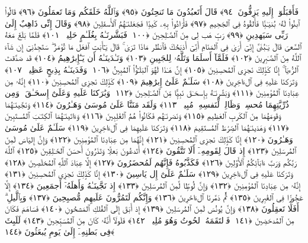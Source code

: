  فَأَقبَلُوٓا۟ إِلَيهِ يَزِفُّونَ ﴿٩٤﴾
 قَالَ أَتَعبُدُونَ مَا تَنحِتُونَ ﴿٩٥﴾
 وَٱللَّهُ خَلَقَكُم وَمَا تَعمَلُونَ ﴿٩٦﴾
 قَالُوا۟ ٱبنُوا۟ لَهُۥ بُنيَـٰنًۭا فَأَلقُوهُ فِى ٱلجَحِيمِ ﴿٩٧﴾
 فَأَرَادُوا۟ بِهِۦ كَيدًۭا فَجَعَلنَـٰهُمُ ٱلأَسفَلِينَ ﴿٩٨﴾
 وَقَالَ إِنِّى ذَاهِبٌ إِلَىٰ رَبِّى سَيَهدِينِ ﴿٩٩﴾
 رَبِّ هَب لِى مِنَ ٱلصَّـٰلِحِينَ ﴿١٠٠﴾
 فَبَشَّرنَـٰهُ بِغُلَـٰمٍ حَلِيمٍۢ ﴿١٠١﴾
 فَلَمَّا بَلَغَ مَعَهُ ٱلسَّعىَ قَالَ يَـٰبُنَىَّ إِنِّىٓ أَرَىٰ فِى ٱلمَنَامِ أَنِّىٓ أَذبَحُكَ فَٱنظُر مَاذَا تَرَىٰ ۚ قَالَ يَـٰٓأَبَتِ ٱفعَل مَا تُؤمَرُ ۖ سَتَجِدُنِىٓ إِن شَآءَ ٱللَّهُ مِنَ ٱلصَّـٰبِرِينَ ﴿١٠٢﴾
 فَلَمَّآ أَسلَمَا وَتَلَّهُۥ لِلجَبِينِ ﴿١٠٣﴾
 وَنَـٰدَينَـٰهُ أَن يَـٰٓإِبرَٰهِيمُ ﴿١٠٤﴾
 قَد صَدَّقتَ ٱلرُّءيَآ ۚ إِنَّا كَذَٟلِكَ نَجزِى ٱلمُحسِنِينَ ﴿١٠٥﴾
 إِنَّ هَـٰذَا لَهُوَ ٱلبَلَـٰٓؤُا۟ ٱلمُبِينُ ﴿١٠٦﴾
 وَفَدَينَـٰهُ بِذِبحٍ عَظِيمٍۢ ﴿١٠٧﴾
 وَتَرَكنَا عَلَيهِ فِى ٱلءَاخِرِينَ ﴿١٠٨﴾
 سَلَـٰمٌ عَلَىٰٓ إِبرَٰهِيمَ ﴿١٠٩﴾
 كَذَٟلِكَ نَجزِى ٱلمُحسِنِينَ ﴿١١٠﴾
 إِنَّهُۥ مِن عِبَادِنَا ٱلمُؤمِنِينَ ﴿١١١﴾
 وَبَشَّرنَـٰهُ بِإِسحَـٰقَ نَبِيًّۭا مِّنَ ٱلصَّـٰلِحِينَ ﴿١١٢﴾
 وَبَٰرَكنَا عَلَيهِ وَعَلَىٰٓ إِسحَـٰقَ ۚ وَمِن ذُرِّيَّتِهِمَا مُحسِنٌۭ وَظَالِمٌۭ لِّنَفسِهِۦ مُبِينٌۭ ﴿١١٣﴾
 وَلَقَد مَنَنَّا عَلَىٰ مُوسَىٰ وَهَـٰرُونَ ﴿١١٤﴾
 وَنَجَّينَـٰهُمَا وَقَومَهُمَا مِنَ ٱلكَربِ ٱلعَظِيمِ ﴿١١٥﴾
 وَنَصَرنَـٰهُم فَكَانُوا۟ هُمُ ٱلغَٰلِبِينَ ﴿١١٦﴾
 وَءَاتَينَـٰهُمَا ٱلكِتَـٰبَ ٱلمُستَبِينَ ﴿١١٧﴾
 وَهَدَينَـٰهُمَا ٱلصِّرَٰطَ ٱلمُستَقِيمَ ﴿١١٨﴾
 وَتَرَكنَا عَلَيهِمَا فِى ٱلءَاخِرِينَ ﴿١١٩﴾
 سَلَـٰمٌ عَلَىٰ مُوسَىٰ وَهَـٰرُونَ ﴿١٢٠﴾
 إِنَّا كَذَٟلِكَ نَجزِى ٱلمُحسِنِينَ ﴿١٢١﴾
 إِنَّهُمَا مِن عِبَادِنَا ٱلمُؤمِنِينَ ﴿١٢٢﴾
 وَإِنَّ إِليَاسَ لَمِنَ ٱلمُرسَلِينَ ﴿١٢٣﴾
 إِذ قَالَ لِقَومِهِۦٓ أَلَا تَتَّقُونَ ﴿١٢٤﴾
 أَتَدعُونَ بَعلًۭا وَتَذَرُونَ أَحسَنَ ٱلخَـٰلِقِينَ ﴿١٢٥﴾
 ٱللَّهَ رَبَّكُم وَرَبَّ ءَابَآئِكُمُ ٱلأَوَّلِينَ ﴿١٢٦﴾
 فَكَذَّبُوهُ فَإِنَّهُم لَمُحضَرُونَ ﴿١٢٧﴾
 إِلَّا عِبَادَ ٱللَّهِ ٱلمُخلَصِينَ ﴿١٢٨﴾
 وَتَرَكنَا عَلَيهِ فِى ٱلءَاخِرِينَ ﴿١٢٩﴾
 سَلَـٰمٌ عَلَىٰٓ إِل يَاسِينَ ﴿١٣٠﴾
 إِنَّا كَذَٟلِكَ نَجزِى ٱلمُحسِنِينَ ﴿١٣١﴾
 إِنَّهُۥ مِن عِبَادِنَا ٱلمُؤمِنِينَ ﴿١٣٢﴾
 وَإِنَّ لُوطًۭا لَّمِنَ ٱلمُرسَلِينَ ﴿١٣٣﴾
 إِذ نَجَّينَـٰهُ وَأَهلَهُۥٓ أَجمَعِينَ ﴿١٣٤﴾
 إِلَّا عَجُوزًۭا فِى ٱلغَٰبِرِينَ ﴿١٣٥﴾
 ثُمَّ دَمَّرنَا ٱلءَاخَرِينَ ﴿١٣٦﴾
 وَإِنَّكُم لَتَمُرُّونَ عَلَيهِم مُّصبِحِينَ ﴿١٣٧﴾
 وَبِٱلَّيلِ ۗ أَفَلَا تَعقِلُونَ ﴿١٣٨﴾
 وَإِنَّ يُونُسَ لَمِنَ ٱلمُرسَلِينَ ﴿١٣٩﴾
 إِذ أَبَقَ إِلَى ٱلفُلكِ ٱلمَشحُونِ ﴿١٤٠﴾
 فَسَاهَمَ فَكَانَ مِنَ ٱلمُدحَضِينَ ﴿١٤١﴾
 فَٱلتَقَمَهُ ٱلحُوتُ وَهُوَ مُلِيمٌۭ ﴿١٤٢﴾
 فَلَولَآ أَنَّهُۥ كَانَ مِنَ ٱلمُسَبِّحِينَ ﴿١٤٣﴾
 لَلَبِثَ فِى بَطنِهِۦٓ إِلَىٰ يَومِ يُبعَثُونَ ﴿١٤٤﴾
